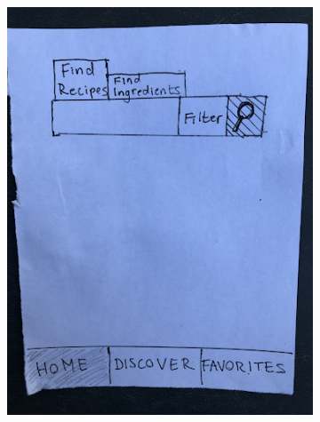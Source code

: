 \documentclass[11pt,english]{article}
\begin{document}
\begin{figure}
  \centering
  \begin{subfigure}[b]{0.4\linewidth}
    \includegraphics[width=\linewidth]{figure8v1.png}
  \end{subfigure}
  \begin{subfigure}[b]{0.4\linewidth}

\end{subfigure}
\end{figure}
\end{document}
